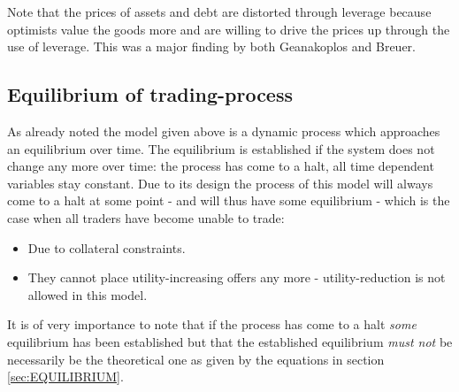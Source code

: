 \documentclass[../Bachelorarbeit.tex]{subfiles}
\begin{document}
\medskip

Note that the prices of assets and debt are distorted through leverage because optimists value the goods more and are willing to drive the prices up through the use of leverage. This was a major finding by both Geanakoplos and Breuer.

\subsection{Equilibrium of trading-process}
As already noted the model given above is a dynamic process which approaches an equilibrium over time. The equilibrium is established if the system does not change any more over time: the process has come to a halt, all time dependent variables stay constant. Due to its design the process of this model will always come to a halt at some point - and will thus have some equilibrium - which is the case when all traders have become unable to trade:

\begin{itemize}
\item Due to collateral constraints.
\item They cannot place utility-increasing offers any more - utility-reduction is not allowed in this model.
\end{itemize}

It is of very importance to note that if the process has come to a halt \textit{some} equilibrium has been established but that the established equilibrium \textit{must not} be necessarily be the theoretical one as given by the equations in section \ref{sec:EQUILIBRIUM}.
\end{document}
